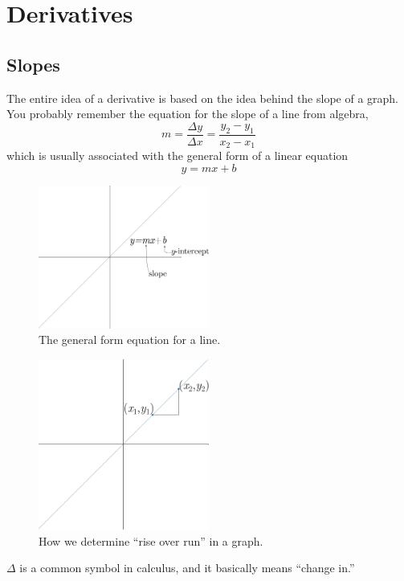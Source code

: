 \chapter{Derivatives}

\section{Slopes}

The entire idea of a derivative is based on the idea behind the slope of a graph. You probably remember the equation for the slope of a line from algebra,
\begin{equation}
  \label{eq:slope}
  m=\frac{\Delta y}{\Delta x}=\frac{y_2-y_1}{x_2-x_1}
\end{equation}
which is usually associated with the general form of a linear equation
\begin{equation}
  y=mx+b
\end{equation}
\begin{figure}[h]
  \begin{center}
    \includegraphics[width=0.5\textwidth]{continuous/derivatives/lineform.eps}
  \end{center}
  \caption{The general form equation for a line.}
\end{figure}
\begin{figure}[h]
  \begin{center}
    \includegraphics[width=0.5\textwidth]{continuous/derivatives/lineform_slope.eps}
  \end{center}
  \caption{How we determine ``rise over run'' in a graph.}
\end{figure}
\begin{remark}
  $\Delta$ is a common symbol in calculus, and it basically means ``change in.''
\end{remark}


